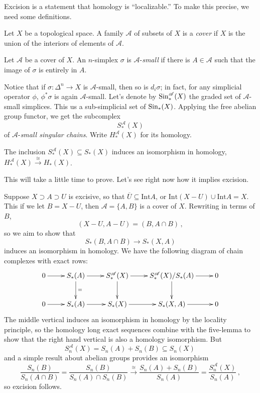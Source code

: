 \bigskip
Excision is a statement that homology is ``localizable.'' To make this precise, we need some definitions. 

\begin{definition}
Let $X$ be a topological space. A family $\mathscr{A}$ of subsets of $X$ is a
{\em cover} if $X$ is the union of the interiors of elements of $\mathscr{A}$. 
\end{definition}
\begin{definition}
Let ${\mathscr{A}}$ be a cover of $X$. An $n$-simplex $\sigma$ is ${\mathscr{A}}$-{\em small} if there is $A\in \mathscr{A}$ such that the image of $\sigma$ is entirely in $A$.
\end{definition}
Notice that if $\sigma:\Delta^n\to X$ is ${\mathscr{A}}$-small, then so is $d_i\sigma$; in fact, for any simplicial operator $\phi$, $\phi^*\sigma$ is again $\mathscr{A}$-small. Let's denote by $\mathrm{Sin}^{\mathscr{A}}_*(X)$ the graded set of ${\mathscr{A}}$-small simplices. This us a sub-simplicial set of $\mathrm{Sin}_*(X)$.
Applying the free abelian group functor, we get the subcomplex 
\[
S^{\mathscr{A}}_\ast(X)
\]
of $\mathscr{A}$-{\em small singular chains}. Write $H^{\mathscr{A}}_*(X)$ for its
homology.
\begin{theorem}
The inclusion $S^\mathscr{A}_\ast(X)\subseteq S_\ast(X)$ induces an isomorphism in homology, $H^\mathscr{A}_\ast(X)\xrightarrow{\cong}H_\ast(X)$. 
\end{theorem}
This will take a little time to prove. Let's see right now how it implies excision.

Suppose $X\supset A\supset U$ is excisive, so that 
$\overline U\subseteq\mathrm{Int}A$, or $\mathrm{Int}(X-U)\cup\mathrm{Int}A=X$.
This if we let $B=X-U$, then $\mathscr{A}=\{A,B\}$ is a cover of $X$. 
Rewriting in terms of $B$,
\[
(X-U,A-U)=(B,A\cap B)\,,
\]
so we aim to show that 
\[
S_*(B,A\cap B)\rightarrow S_*(X,A)
\]
induces an isomorphism in homology. We have the following diagram of chain complexes with exact rows:
\[
\xymatrix{
0 \ar[r] & S_*(A) \ar[d]^= \ar[r] & S^{\mathscr{A}}_*(X) \ar[d]\ar[r] &
S^{\mathscr{A}}_*(X)/S_*(A) \ar[d]\ar[r] & 0 \\
0 \ar[r] & S_*(A) \ar[r] & S_*(X) \ar[r] & S_*(X,A) \ar[r] & 0 
}\]
The middle vertical induces an isomorphism in homology by the locality principle, so the homology long exact sequences combine with the five-lemma to show that the right hand vertical is also a homology isomorphism. But 
\[
S^{\mathscr{A}}_n(X)=S_n(A)+S_n(B)\subseteq S_n(X)\,
\]
and a simple result about abelian groups provides an isomorphism
\[
\frac{S_n(B)}{S_n(A\cap B)}=
\frac{S_n(B)}{S_n(A)\cap S_n(B)}\xrightarrow{\cong}
\frac{S_n(A)+S_n(B)}{S_n(A)}
=\frac{S_n^{\mathscr{A}}(X)}{S_n(A)}\,,
\]
so excision follows.

